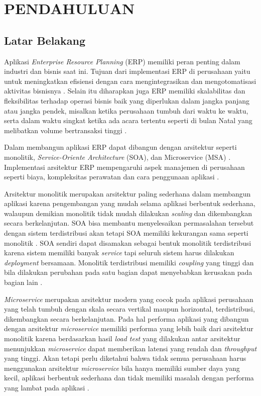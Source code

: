 \chapter{PENDAHULUAN}
\section{Latar Belakang}
Aplikasi \textit{Enterprise Resource Planning} (ERP) memiliki peran penting dalam industri dan bisnis saat ini. Tujuan dari implementasi ERP di perusahaan yaitu untuk meningkatkan efisiensi dengan cara mengintegrasikan dan mengotomatisasi aktivitas bisnisnya \cite{612}. Selain itu diharapkan juga ERP memiliki skalabilitas dan fleksibilitas terhadap operasi bisnis baik yang diperlukan dalam jangka panjang atau jangka pendek, misalkan ketika perusahaan tumbuh dari waktu ke waktu, serta dalam waktu singkat ketika ada acara tertentu seperti di bulan Natal yang melibatkan volume bertransaksi tinggi \cite{D94}.

Dalam membangun aplikasi ERP dapat dibangun dengan arsitektur seperti monolitik, \textit{Service-Oriente Architecture} (SOA), dan Microservice (MSA) \cite{5FA}. Implementasi arsitektur ERP mempengaruhi aspek manajemen di perusahaan seperti biaya, kompleksitas perawatan dan cara penggunaan aplikasi \cite{612}.

Arsitektur monolitik merupakan arsitektur paling sederhana dalam membangun aplikasi karena pengembangan yang mudah selama aplikasi berbentuk sederhana, walaupun demikian monolitik tidak mudah dilakukan \textit{scaling} dan dikembangkan secara berkelanjutan. SOA bisa membantu menyelesaikan permasalahan tersebut dengan sistem terdistribusi akan tetapi SOA memiliki kekurangan sama seperti monolitik \cite{5FA}. SOA sendiri dapat disamakan sebagai bentuk monolitik terdistribusi karena sistem memiliki banyak \textit{service} tapi seluruh sistem harus dilakukan \textit{deployment} bersamaan. Monolitik terdistribusi memiliki  \textit{coupling} yang tinggi dan bila dilakukan perubahan pada satu bagian dapat menyebabkan kerusakan pada bagian lain \cite{74C}.

\textit{Microservice} merupakan arsitektur modern yang cocok pada aplikasi perusahaan yang telah tumbuh dengan skala secara vertikal maupun horizontal, terdistribusi, dikembangkan secara berkelanjutan. Pada hal performa aplikasi yang dibangun dengan arsitektur \textit{microservice} memiliki performa yang lebih baik dari arsitektur monolitik karena berdasarkan hasil \textit{load test} yang dilakukan antar arsitektur menunjukkan \textit{microservice} dapat memberikan latensi yang rendah dan \textit{throughput} yang tinggi. Akan tetapi perlu diketahui bahwa tidak semua perusahaan harus menggunakan arsitektur \textit{microservice} bila hanya memiliki sumber daya yang kecil, aplikasi berbentuk sederhana dan tidak memiliki masalah dengan performa yang lambat pada aplikasi \cite{5FA}.

